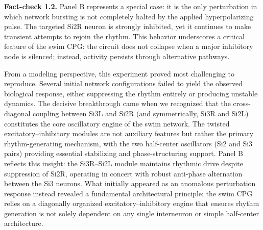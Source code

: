 \documentclass[nofootinbib,aip,amsmath,amssymb,preprint,twocolumn,floatfix,10pt]{revtex4-2}
\begin{document}

{\bf Fact-check 1.2.}
Panel B represents a special case: it is the only perturbation in which network bursting is not completely halted by the applied hyperpolarizing pulse. The targeted Si2R neuron is strongly inhibited, yet it continues to make transient attempts to rejoin the rhythm. This behavior underscores a critical feature of the swim CPG: the circuit does not collapse when a major inhibitory node is silenced; instead, activity persists through alternative pathways. 

From a modeling perspective, this experiment proved most challenging to reproduce. Several initial network configurations failed to yield the observed biological response, either suppressing the rhythm entirely or producing unstable dynamics. The decisive breakthrough came when we recognized that the cross-diagonal coupling between Si3L and Si2R (and symmetrically, Si3R and Si2L) constitutes the core oscillatory engine of the swim network. The twisted excitatory--inhibitory modules are not auxiliary features but rather the primary rhythm-generating mechanism, with the two half-center oscillators (Si2 and Si3 pairs) providing essential stabilizing and phase-structuring support. Panel B reflects this insight: the Si3R--Si2L module maintains rhythmic drive despite suppression of Si2R, operating in concert with robust anti-phase alternation between the Si3 neurons. What initially appeared as an anomalous perturbation response instead revealed a fundamental architectural principle: the swim CPG relies on a diagonally organized excitatory--inhibitory engine that ensures rhythm generation is not solely dependent on any single interneuron or simple half-center architecture.    
\end{document}
